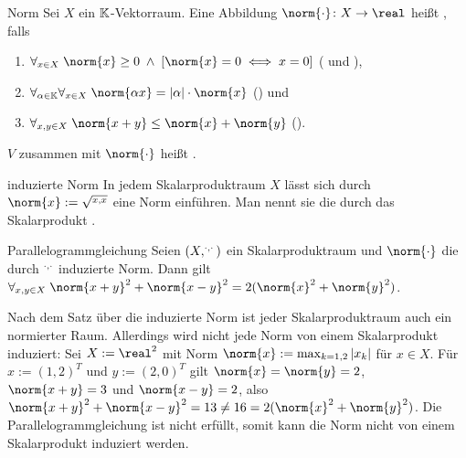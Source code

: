 \begin{Def}{Norm}
    Sei $X$ ein $\mathbb{K}$-Vektorraum.
    Eine Abbildung $\norm{\cdot}\colon X \rightarrow \real$ heißt , falls
    \begin{enumerate}
        \item
        $\forall_{x \in X}\; \norm{x} \ge 0 \;\land\; \left[\norm{x} = 0 \iff x = 0\right]$
        ( und ),
        
        \item
        $\forall_{\alpha \in \KK} \forall_{x \in X}\; \norm{\alpha x} = |\alpha| \cdot \norm{x}$
        () und
        
        \item
        $\forall_{x, y \in X}\; \norm{x + y} \le \norm{x} + \norm{y}$
        ().
    \end{enumerate}
    $V$ zusammen mit $\norm{\cdot}$ heißt .
\end{Def}

\linie
\pagebreak

\begin{Satz}{induzierte Norm}
    In jedem Skalarproduktraum $X$ lässt sich durch $\norm{x} := \sqrt{\sp{x, x}}$ eine Norm
    einführen.
    Man nennt sie die durch das Skalarprodukt .
\end{Satz}

\begin{Satz}{Parallelogrammgleichung}
    Seien $(X, \sp{\cdot, \cdot})$ ein Skalarproduktraum und $\norm{\cdot}$ die durch
    $\sp{\cdot, \cdot}$ induzierte Norm.
    Dann gilt
    $\forall_{x, y \in X}\; \norm{x + y}^2 + \norm{x - y}^2 = 2(\norm{x}^2 + \norm{y}^2)$.
\end{Satz}

\begin{Bem}
    Nach dem Satz über die induzierte Norm ist jeder Skalarproduktraum auch ein normierter Raum.
    Allerdings wird nicht jede Norm von einem Skalarprodukt induziert:
    Sei $X := \real^2$ mit Norm $\norm{x} := \max_{k = 1, 2} |x_k|$ für $x \in X$.
    Für $x := (1, 2)^T$ und $y := (2, 0)^T$ gilt $\norm{x} = \norm{y} = 2$,
    $\norm{x + y} = 3$ und $\norm{x - y} = 2$, also
    $\norm{x + y}^2 + \norm{x - y}^2 = 13 \not= 16 = 2(\norm{x}^2 + \norm{y}^2)$.
    Die Parallelogrammgleichung ist nicht erfüllt, somit kann die Norm nicht von einem
    Skalarprodukt induziert werden.
\end{Bem}

